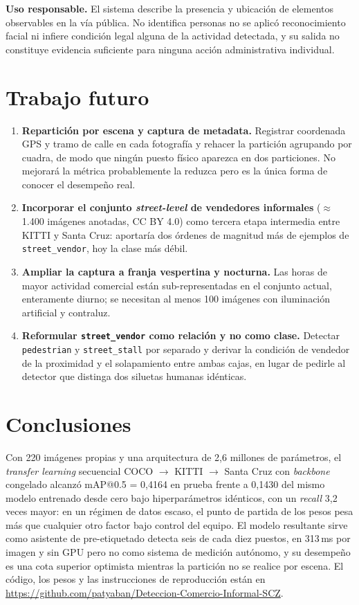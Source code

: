 \documentclass[10pt,a4paper]{article}
\newcommand{\repositorio}{https://github.com/patyaban/Deteccion-Comercio-Informal-SCZ}
\begin{document}
\textbf{Uso responsable.} El sistema describe la presencia y ubicación de elementos
observables en la vía pública. No identifica personas no se aplicó reconocimiento
facial ni infiere condición legal alguna de la actividad detectada, y su salida no
constituye evidencia suficiente para ninguna acción administrativa individual.

\section{Trabajo futuro}
\begin{enumerate}[leftmargin=*]
  \item \textbf{Repartición por escena y captura de metadata.} Registrar coordenada GPS y
        tramo de calle en cada fotografía y rehacer la partición agrupando por cuadra, de
        modo que ningún puesto físico aparezca en dos particiones. No mejorará la métrica
        probablemente la reduzca pero es la única forma de conocer el desempeño real.
  \item \textbf{Incorporar el conjunto \emph{street-level} de vendedores informales}
        \cite{streetlevel} ($\approx$1{.}400 imágenes anotadas, CC BY 4.0) como tercera
        etapa intermedia entre KITTI y Santa Cruz: aportaría dos órdenes de magnitud más
        de ejemplos de \texttt{street\_vendor}, hoy la clase más débil.
  \item \textbf{Ampliar la captura a franja vespertina y nocturna.} Las horas de mayor
        actividad comercial están sub-representadas en el conjunto actual, enteramente
        diurno; se necesitan al menos 100 imágenes con iluminación artificial y contraluz.
  \item \textbf{Reformular \texttt{street\_vendor} como relación y no como clase.}
        Detectar \texttt{pedestrian} y \texttt{street\_stall} por separado y derivar la
        condición de vendedor de la proximidad y el solapamiento entre ambas cajas, en
        lugar de pedirle al detector que distinga dos siluetas humanas idénticas.
\end{enumerate}

\section{Conclusiones}
Con 220 imágenes propias y una arquitectura de 2{,}6 millones de parámetros, el
\emph{transfer learning} secuencial COCO $\rightarrow$ KITTI $\rightarrow$ Santa Cruz con
\emph{backbone} congelado alcanzó mAP@0.5 = 0{,}4164 en prueba frente a 0{,}1430 del mismo
modelo entrenado desde cero bajo hiperparámetros idénticos, con un \emph{recall} 3{,}2
veces mayor: en un régimen de datos escaso, el punto de partida de los pesos pesa más que
cualquier otro factor bajo control del equipo. El modelo resultante sirve como asistente
de pre-etiquetado detecta seis de cada diez puestos, en 313\,ms por imagen y sin
GPU pero no como sistema de medición autónomo, y su desempeño es una cota superior
optimista mientras la partición no se realice por escena. El código, los pesos y las
instrucciones de reproducción están en \url{\repositorio}.
\end{document}
